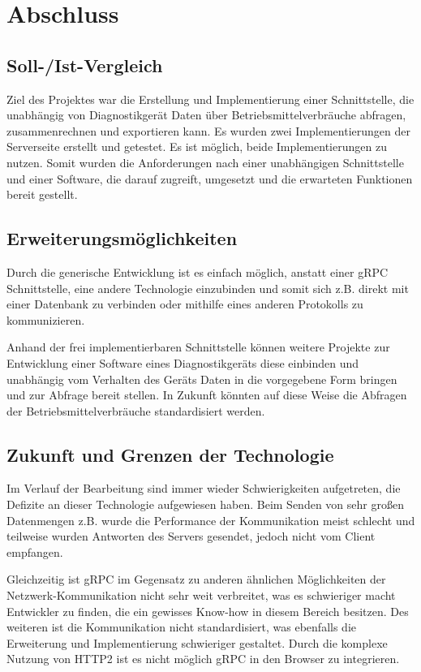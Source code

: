 \section{Abschluss}
\label{sec:Abschluss}

\subsection{Soll-/Ist-Vergleich}
\label{sec:SollIstVergleich}
Ziel des Projektes war die Erstellung und Implementierung einer Schnittstelle, die unabhängig von Diagnostikgerät Daten über Betriebsmittelverbräuche abfragen, zusammenrechnen und exportieren kann. Es wurden zwei Implementierungen der Serverseite erstellt und getestet. Es ist möglich, beide Implementierungen zu nutzen. Somit wurden die Anforderungen nach einer unabhängigen Schnittstelle und einer Software, die darauf zugreift, umgesetzt und die erwarteten Funktionen bereit gestellt.

\subsection{Erweiterungsmöglichkeiten}
\label{sec:Erweiterungsmoeglichkeiten}
Durch die generische Entwicklung ist es einfach möglich, anstatt einer {\acs{gRPC}} Schnittstelle, eine andere Technologie einzubinden und somit sich z.B. direkt mit einer Datenbank zu verbinden oder mithilfe eines anderen Protokolls zu kommunizieren.

Anhand der frei implementierbaren Schnittstelle können weitere Projekte zur Entwicklung einer Software eines Diagnostikgeräts diese einbinden und unabhängig vom Verhalten des Geräts Daten in die vorgegebene Form bringen und zur Abfrage bereit stellen. In Zukunft könnten auf diese Weise die Abfragen der Betriebsmittelverbräuche standardisiert werden.

\subsection{Zukunft und Grenzen der Technologie}
\label{sec:ZukunftUndGrenzen}
Im Verlauf der Bearbeitung sind immer wieder Schwierigkeiten aufgetreten, die Defizite an dieser Technologie aufgewiesen haben. Beim Senden von sehr großen Datenmengen z.B. wurde die Performance der Kommunikation meist schlecht und teilweise wurden Antworten des Servers gesendet, jedoch nicht vom Client empfangen.

Gleichzeitig ist {\acs{gRPC}} im Gegensatz zu anderen ähnlichen Möglichkeiten der Netzwerk-Kommunikation nicht sehr weit verbreitet, was es schwieriger macht Entwickler zu finden, die ein gewisses Know-how in diesem Bereich besitzen. Des weiteren ist die Kommunikation nicht standardisiert, was ebenfalls die Erweiterung und Implementierung schwieriger gestaltet. Durch die komplexe Nutzung von {\acs{HTTP2}} ist es nicht möglich {\acs{gRPC}} in den Browser zu integrieren.


